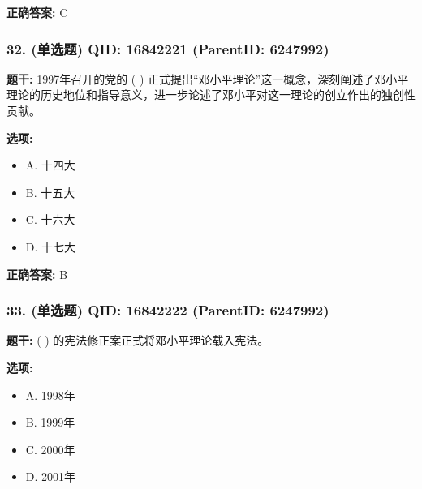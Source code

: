 \documentclass[12pt,UTF8]{ctexart}
\begin{document}
\textbf{正确答案:}
C

\vspace{0.3em}\hrulefill\vspace{0.7em}

\subsubsection*{32. (单选题) \small QID: 16842221 (ParentID: 6247992)}

\textbf{题干:}
1997年召开的党的 ( ) 正式提出“邓小平理论”这一概念，深刻阐述了邓小平理论的历史地位和指导意义，进一步论述了邓小平对这一理论的创立作出的独创性贡献。



\textbf{选项:}
\begin{itemize}[leftmargin=*]

  \item A. 十四大

  \item B. 十五大

  \item C. 十六大

  \item D. 十七大

\end{itemize}

\textbf{正确答案:}
B

\vspace{0.3em}\hrulefill\vspace{0.7em}

\subsubsection*{33. (单选题) \small QID: 16842222 (ParentID: 6247992)}

\textbf{题干:}
( ) 的宪法修正案正式将邓小平理论载入宪法。



\textbf{选项:}
\begin{itemize}[leftmargin=*]

  \item A. 1998年

  \item B. 1999年

  \item C. 2000年

  \item D. 2001年

\end{itemize}
\end{document}
